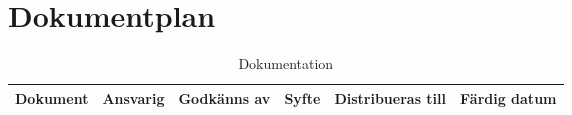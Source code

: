 \section{Dokumentplan}

\begin{table}[h]
	\centering
		\begin{tabularx}{\textwidth}{| l | l | X | l | l | l |}
			\hline
			\textbf{Dokument} & \textbf{Ansvarig} & \textbf{Godkänns av} & \textbf{Syfte} & \textbf{Distribueras till} & \textbf{Färdig datum} \\
			\hline

		\end{tabularx}
	\caption{Dokumentation} \label{dokumentation:tabell}
\end{table}